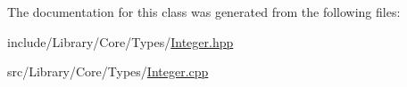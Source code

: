 The documentation for this class was generated from the following files\+:\begin{DoxyCompactItemize}
\item 
include/\+Library/\+Core/\+Types/\hyperlink{_integer_8hpp}{Integer.\+hpp}\item 
src/\+Library/\+Core/\+Types/\hyperlink{_integer_8cpp}{Integer.\+cpp}\end{DoxyCompactItemize}

